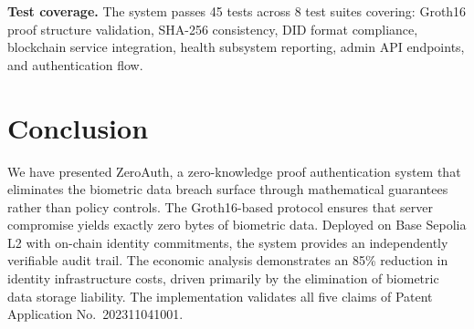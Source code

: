 \documentclass[journal, letterpaper, 10pt]{IEEEtran}
\begin{document}
\textbf{Test coverage.} The system passes 45 tests across 8 test suites covering: Groth16 proof structure validation, SHA-256 consistency, DID format compliance, blockchain service integration, health subsystem reporting, admin API endpoints, and authentication flow.

\section{Conclusion}

We have presented ZeroAuth, a zero-knowledge proof authentication system that eliminates the biometric data breach surface through mathematical guarantees rather than policy controls. The Groth16-based protocol ensures that server compromise yields exactly zero bytes of biometric data. Deployed on Base Sepolia L2 with on-chain identity commitments, the system provides an independently verifiable audit trail. The economic analysis demonstrates an 85\% reduction in identity infrastructure costs, driven primarily by the elimination of biometric data storage liability. The implementation validates all five claims of Patent Application No.\ 202311041001.
\end{document}
